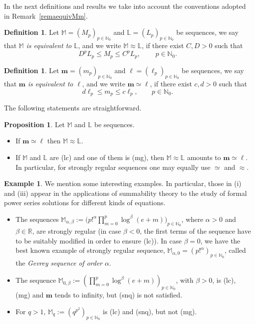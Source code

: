 \documentclass[11pt,a4paper]{article}
\theoremstyle{definition}
\newtheorem{pro}[theo]{Proposition}
\newtheorem{defi}[theo]{Definition}
\newtheorem{exam}[theo]{Example}
\newenvironment{prop}{\smallskip\begin{pro}}{\end{pro}\smallskip}
\def\a{\alpha}
\def\b{\beta}
\def\bl{\boldsymbol{\ell}}
\def\N{\mathbb{N}}
\def\R{\mathbb{R}}
\def\M{\mathbb{M}}
\def\L{\mathbb{L}} %
\def\bm{\boldsymbol{m}}
\begin{document}
In the next definitions and results we take into account the conventions adopted in Remark~\ref{remaequivMm}.

\begin{defi} Let $\M=(M_p)_{p\in\N_0}$ and $\L=(L_p)_{p\in\N_0}$ be sequences, we say that {\it $\M$ is equivalent to $\L$},
and we write $\M\approx\L$, if there exist $C,D>0$ such that
 $$D^p L_p \leq M_p \leq C^p L_p, \qquad\, p \in \N_0.$$
\end{defi}



\begin{defi} Let $\bm=(m_p)_{p\in\N_0}$ and $\bl=(\ell_p)_{p\in\N_0}$ be sequences,
we say that {\it $\bm$ is equivalent to $\bl$}, and we write $\bm\simeq\bl$, if there exist $c,d>0$ such that
 $$d  \ell_p \leq m_p \leq c \ell_p, \qquad p \in \N_0.$$
\end{defi}

The following statements are straightforward.

\begin{prop}\label{propRelacionOrdenes}
Let $\M$ and $\L$ be sequences.
\begin{itemize}
\item[(i)] If  $\bm\simeq\bl$ then  $\M\approx\L$.
\item[(ii)] If $\M$ and $\L$ are (lc) and one of them is (mg), then $\M\approx\L$ amounts to $\bm\simeq\bl$.
In particular, for strongly regular sequences one may equally use $\simeq$ and $\approx$.
\end{itemize}
\end{prop}

\begin{exam}\label{exampleSequences}
We mention some interesting examples. In particular, those in (i) and (iii) appear in the applications of summability theory to the study of formal power series solutions for different kinds of equations.
\begin{itemize}
\item[(i)] The sequences $\M_{\a,\b}:=\big(p!^{\a}\prod_{m=0}^p\log^{\b}(e+m)\big)_{p\in\N_0}$, where $\a>0$ and $\b\in\R$, are strongly regular (in case $\b<0$, the first terms of the sequence have to be suitably modified in order to ensure (lc)). In case $\b=0$, we have the best known example of strongly regular sequence, $\M_{\a,0}=(p!^{\a})_{p\in\N_{0}}$, called the \textit{Gevrey sequence of order $\a$}.
\item[(ii)] The sequence $\M_{0,\b}:=(\prod_{m=0}^p\log^{\b}(e+m))_{p\in\N_0}$, with $\b>0$, is (lc), (mg) and $\bm$ tends to infinity, but (snq) is not satisfied.
\item[(iii)] For $q>1$, $\M_q:=(q^{p^2})_{p\in\N_0}$ is (lc) and (snq), but not (mg).
\end{itemize}
\end{exam}
\end{document}
